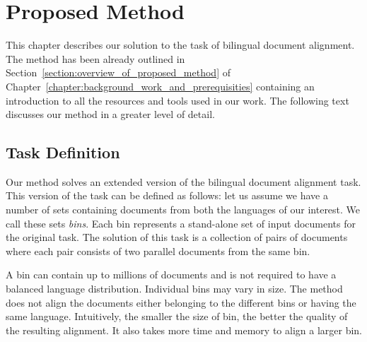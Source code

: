 
\chapter{Proposed Method}
\label{chapter:proposed_method}

This chapter describes our solution to the task of bilingual document alignment. The method has been already outlined in Section~\ref{section:overview_of_proposed_method} of Chapter~\ref{chapter:background_work_and_prerequisities} containing an introduction to all the resources and tools used in our work. The following text discusses our method in a greater level of detail.

\section{Task Definition}
\label{section:task_definition}

Our method solves an extended version of the bilingual document alignment task. This version of the task can be defined as follows: let us assume we have a number of sets containing documents from both the languages of our interest. We call these sets \textit{bins}. Each bin represents a stand-alone set of input documents for the original task. The solution of this task is a collection of pairs of documents where each pair consists of two parallel documents from the same bin.

A bin can contain up to millions of documents and is not required to have a balanced language distribution. Individual bins may vary in size. The method does not align the documents either belonging to the different bins or having the same language. Intuitively, the smaller the size of bin, the better the quality of the resulting alignment. It also takes more time and memory to align a larger bin.

